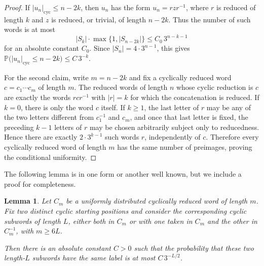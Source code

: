 \documentclass{amsproc}
\newtheorem{lemma}[theorem]{Lemma}
\newcommand{\Prob}{\mathbb P}
\begin{document}
\begin{proof}
If $|u_n|_{\mathrm{cyc}}\leq n-2k$, then $u_n$ has the form $u_n=r z r^{-1}$,
where $r$ is reduced of length $k$ and $z$ is reduced, or trivial, of length
$n-2k$.  Thus the number of such words is at most
\[
        |S_k|\cdot \max\{1,|S_{n-2k}|\}
        \leq C_0\,3^{n-k-1}
\]
for an absolute constant $C_0$.  Since $|S_n|=4\cdot 3^{n-1}$, this gives
$\Prob\bigl(|u_n|_{\mathrm{cyc}}\leq n-2k\bigr)\leq C\,3^{-k}$.

For the second claim, write $m=n-2k$ and fix a cyclically reduced word
$c=c_1\cdots c_m$ 
of length $m$.  The reduced words of length $n$ whose cyclic reduction is $c$
are exactly the words $r c r^{-1}$ 
with $|r|=k$ for which the concatenation is reduced.  If $k=0$, there is only
the word $c$ itself.  If $k\geq 1$, the last letter of $r$ may be any of the
two letters different from $c_1^{-1}$ and $c_m$, and once that last letter is
fixed, the preceding $k-1$ letters of $r$ may be chosen arbitrarily subject
only to reducedness.  Hence there are exactly $2\cdot 3^{k-1}$ such words $r$,
independently of $c$.  Therefore every cyclically reduced word
of length $m$ has the same number of preimages, proving the conditional
uniformity.
\end{proof}

The following lemma is in one form or another well known, but we include a proof for completeness.

\begin{lemma}
Let $C_m$ be a uniformly distributed cyclically reduced word of length $m$.
Fix two distinct cyclic starting positions and consider the corresponding cyclic
subwords of length $L$, either both in $C_m$ or with one taken in $C_m$ and the
other in $C_m^{-1}$, with $m\geq 6L$.

Then there is an absolute constant $C>0$ such that the probability that these
two length-$L$ subwords have the same label is at most $C\,3^{-L/2}$.
\end{lemma}
\end{document}
